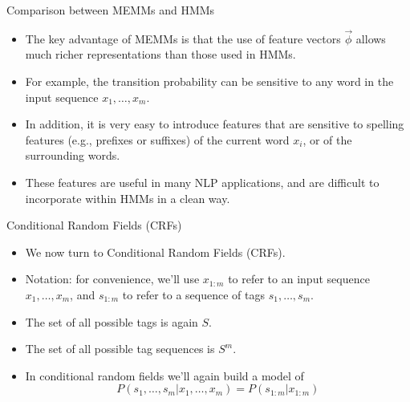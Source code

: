 \documentclass[handout]{beamer}
\begin{document}
\begin{frame}{Comparison between MEMMs and HMMs}
\begin{scriptsize}

\begin{itemize}

\item  The key advantage of MEMMs is that the use of feature vectors $\vec{\phi}$ allows much
richer representations than those used in HMMs.

\item For example, the transition probability can be sensitive to any word in the input sequence $x_1, \dots, x_m$.

\item In addition, it is very easy to introduce features that are sensitive to spelling features (e.g., prefixes or suffixes) of the current word $x_i$, or of the surrounding words.

\item These features are useful in many NLP applications, and are difficult to incorporate within HMMs in a clean way.

\end{itemize}

\end{scriptsize}
\end{frame}



\begin{frame}{Conditional Random Fields (CRFs)}
\begin{scriptsize}

\begin{itemize}

\item  We now turn to Conditional Random Fields (CRFs).

\item Notation: for convenience, we'll use $x_{1:m}$ to refer to an input sequence $x_1 ,\dots,x_m$, and $s_{1:m}$ to refer to a sequence of tags $s_1, \dots, s_m$.

\item The set of all possible tags is again $S$.

\item The set of all possible tag sequences is $S^m$.

\item In conditional random fields we'll again build a model of
\begin{displaymath}
 P(s_1, \dots, s_m | x_1, \dots, x_m) = P(s_{1:m}|x_{1:m})
\end{displaymath}


\end{itemize}

\end{scriptsize}
\end{frame}
\end{document}
